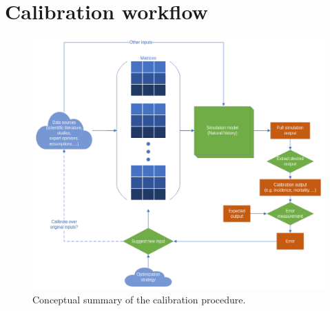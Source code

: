 
\chapter{Calibration workflow} %

\label{sec:calibration} %

\begin{figure}[h]
	\centering
	\includegraphics[width=\textwidth]{figures/calibration_workflow}
	\decoRule
	\caption[Calibration workflow]{Conceptual summary of the calibration procedure.}
	\label{fig:calibration_workflow}
\end{figure}

